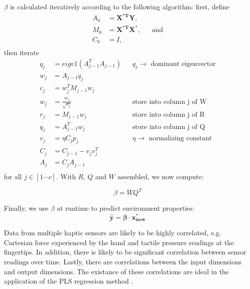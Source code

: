$\beta$ is calculated iteratively according to the following algorithm:
first, define 
\begin{equation}
\begin{aligned}
A_0& = \mathbf{X^{*T}}\mathbf{Y}, \\
M_0& = \mathbf{X^{*T}}\mathbf{X^*},&& \text{and} \\
C_0& = I,\\
\end{aligned}
\end{equation}
then iterate
\begin{equation}
\begin{aligned}
q_j& = eigv1(A^T_{j-1}A_{j-1}) && \text{$q_j \rightarrow$ dominant eigenvector} \\
w_j& = A_{j-1}q_j \\%
c_j& = w^T_jM_{j-1}w_j \\%
w_j& = \frac{w_j}{\sqrt{c_j}} && \text{store into column j of W}\\
r_j& =M_{j-1}w_j && \text{store into column j of R}\\
q_j& =A^T_{j-1}w_j && \text{store into column j of Q}\\
v_j& =\eta C_jp_j && \text{$\eta \rightarrow$ normalizing constant}\\
C_j& =C_{j-1}-v_jv_j^T \\%
A_j& =C_jA_{j-1} \\%
\end{aligned}
\end{equation}
for all $j \in [1 \cdots c]$.
With $R$, $Q$ and $W$ assembled, we now compute: 

\begin{equation}
\beta = WQ^T
\end{equation}

Finally, we use $\beta$ at runtime to predict environment properties:
  \begin{equation} \mathbf{\hat{y}} = \mathbf{\beta} \cdot \mathbf{x^*_{new}} \end{equation}

Data from multiple haptic sensors are likely to be highly correlated, e.g. Cartesian force experienced by the hand and tactile pressure readings at the fingertips.
In addition, there is likely to be significant correlation between sensor readings over time.
Lastly, there are correlations between the input dimensions and output dimensions.
The existance of these correlations are ideal in the application of the PLS  regression method \cite{Tobias1995}.

